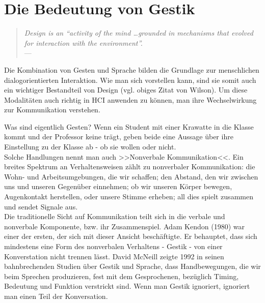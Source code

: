 \section{Die Bedeutung von Gestik}\label{sec:Gestik}

\begin{quote}
	\begin{flushright}{\slshape    
	    Design is an “activity of the mind \ldots grounded in mechanisms that evolved for interaction with the environment”.} \\ \medskip
	    ---  \citep{Wilson:2002}
	\end{flushright}
\end{quote}

Die Kombination von Gesten und Sprache bilden die Grundlage zur menschlichen dialogorientierten Interaktion. Wie man sich vorstellen kann, sind sie somit auch ein wichtiger Bestandteil von Design (vgl. obiges Zitat von Wilson). Um diese Modalitäten auch richtig in \ac{HCI} anwenden zu können, man ihre Wechselwirkung zur Kommunikation verstehen.

\medskip Was sind eigentlich Gesten? Wenn ein Student mit einer Krawatte in die Klasse kommt und der Professor keine trägt, geben beide eine Aussage über ihre Einstellung zu der Klasse ab - ob sie wollen oder nicht. \\ Solche Handlungen nennt man auch >>Nonverbale Kommunikation<<. Ein breites Spektrum an Verhaltensweisen zählt zu nonverbaler Kommunikation: die Wohn- und Arbeitsumgebungen, die wir schaffen; den Abstand, den wir zwischen uns und unseren Gegenüber einnehmen; ob wir unseren Körper bewegen, Augenkontakt herstellen, oder unsere Stimme erheben; all dies spielt zusammen und sendet Signale aus. \\
Die traditionelle Sicht auf Kommunikation teilt sich in die verbale und nonverbale Komponente, bzw. ihr Zusammenspiel. Adam Kendon (1980) war einer der ersten, der sich mit dieser Ansicht beschäftigte. Er behauptet, dass sich mindestens eine Form des nonverbalen Verhaltens - Gestik - von einer Konverstation nicht trennen lässt. David McNeill zeigte 1992 in seinen bahnbrechenden Studien über Gestik und Sprache, dass Handbewegungen, die wir beim Sprechen produzieren, fest mit dem Gesprochenen, bezüglich Timing, Bedeutung und Funktion verstrickt sind. Wenn man Gestik ignoriert, ignoriert man einen Teil der Konversation.

